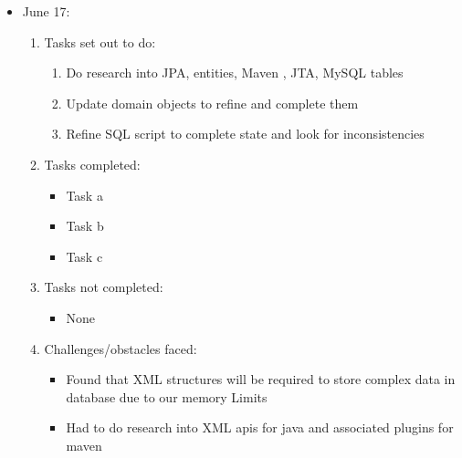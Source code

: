 \documentclass[12pt]{article}
\begin{document}
	\begin{itemize}
		\item June 17:
		\begin{enumerate}
			\item Tasks set out to do:
			\begin{enumerate}
				\item Do research into JPA, entities, Maven , JTA, MySQL tables
				\item Update domain objects to refine and complete them
				\item Refine SQL script to complete state and look for inconsistencies
			\end{enumerate}
			\item Tasks completed:
			\begin{itemize}
				\item Task a
				\item Task b
				\item Task c
			\end{itemize}
			\item Tasks not completed:
			\begin{itemize}
				\item None
			\end{itemize}
			\item Challenges/obstacles faced:
			\begin{itemize}
				\item Found that XML structures will be required to store complex data in database due to our memory Limits
				\item Had to do research into XML apis for java and associated plugins for maven
			\end{itemize}			
		\end{enumerate}
	\end{itemize}
	
\end{document}
